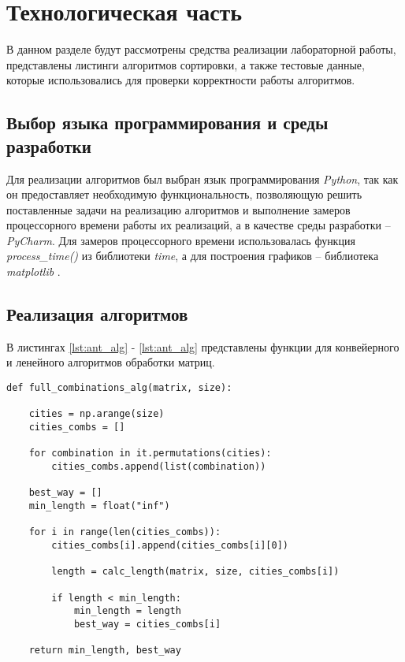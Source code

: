 \chapter{Технологическая часть}

В данном разделе будут рассмотрены средства реализации лабораторной работы, представлены листинги алгоритмов сортировки, а также тестовые данные, которые использовались для проверки корректности работы алгоритмов.

\section{Выбор языка программирования и среды разработки}
Для реализации алгоритмов был выбран язык программирования \textit{Python}, так как он предоставляет необходимую функциональность, позволяющую решить поставленные задачи на реализацию алгоритмов и выполнение замеров процессорного времени работы их реализаций, а в качестве среды разработки -- \textit{PyCharm}.
Для замеров процессорного времени использовалась функция \textit{process\_time()} \cite{time} из библиотеки \textit{time}, а для построения графиков -- библиотека \textit{matplotlib} \cite{mpl}.

\section{Реализация алгоритмов}

В листингах \ref{lst:ant_alg} - \ref{lst:ant_alg} представлены функции для конвейерного и ленейного алгоритмов обработки матриц.

\begin{center}
\captionsetup{justification=raggedright,singlelinecheck=off}
\begin{lstlisting}[label=lst:full_combinations_alg,caption=Алгоритм полного перебора]
def full_combinations_alg(matrix, size):

	cities = np.arange(size)
	cities_combs = []

	for combination in it.permutations(cities):
		cities_combs.append(list(combination))

	best_way = []
	min_length = float("inf")

	for i in range(len(cities_combs)):
		cities_combs[i].append(cities_combs[i][0])

		length = calc_length(matrix, size, cities_combs[i])

		if length < min_length:
			min_length = length
			best_way = cities_combs[i]

	return min_length, best_way
\end{lstlisting}
\end{center}	

